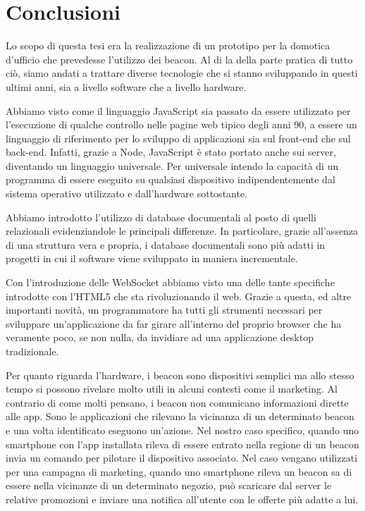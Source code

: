 \chapter{Conclusioni}
\label{chap:conc}

Lo scopo di questa tesi era la realizzazione di un prototipo per la domotica d'ufficio che prevedesse l'utilizzo dei beacon.
Al di la della parte pratica di tutto ciò, siamo andati a trattare diverse tecnologie che si stanno sviluppando in questi ultimi anni, sia a livello software che a livello hardware.

Abbiamo visto come il linguaggio JavaScript sia passato da essere utilizzato per l'esecuzione di qualche controllo nelle pagine web tipico degli anni 90, a essere un linguaggio di riferimento per lo sviluppo di applicazioni sia sul front-end che sul back-end.
Infatti, grazie a Node, JavaScript è stato portato anche sui server, diventando un linguaggio universale. 
Per universale intendo la capacità di un programma di essere eseguito su qualsiasi dispositivo indipendentemente dal sistema operativo utilizzato e dall'hardware sottostante.

Abbiamo introdotto l'utilizzo di database documentali al posto di quelli relazionali evidenziandole le principali differenze.
In particolare, grazie all'assenza di una struttura vera e propria, i database documentali sono più adatti in progetti in cui il software viene sviluppato in maniera incrementale.

Con l'introduzione delle WebSocket abbiamo visto una delle tante specifiche introdotte con l'HTML5 che sta rivoluzionando il web.
Grazie a questa, ed altre importanti novità, un programmatore ha tutti gli strumenti necessari per sviluppare un'applicazione da far girare all'interno del proprio browser che ha veramente poco, se non nulla, da invidiare ad una applicazione desktop tradizionale.
   
Per quanto riguarda l'hardware, i beacon sono dispositivi semplici ma allo stesso tempo si possono rivelare molto utili in alcuni contesti come il marketing. 
Al contrario di come molti pensano, i beacon non comunicano informazioni dirette alle app. 
Sono le applicazioni che rilevano la vicinanza di un determinato beacon e una volta identificato eseguono un'azione.
Nel nostro caso specifico, quando uno smartphone con l'app installata rileva di essere entrato nella regione di un beacon invia un comando per pilotare il dispositivo associato.
Nel caso vengano utilizzati per una campagna di marketing, quando uno smartphone rileva un beacon sa di essere nella vicinanze di un determinato negozio, può scaricare dal server le relative promozioni e inviare una notifica all'utente con le offerte più adatte a lui.

